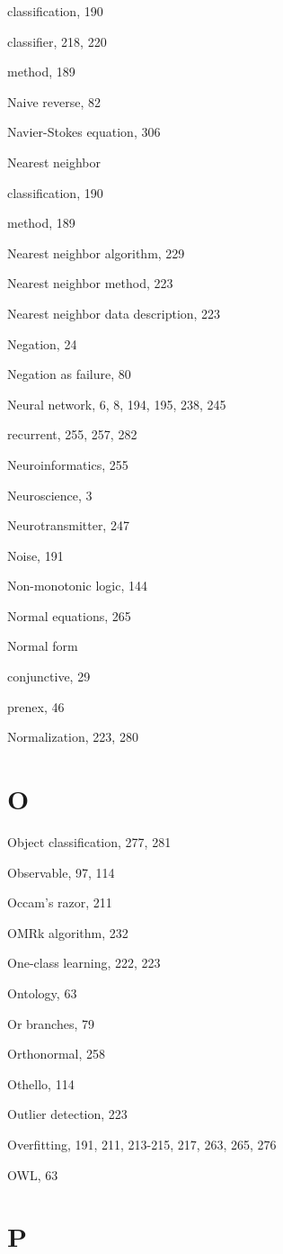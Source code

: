 \documentclass[10pt]{book}
\begin{document}
classification, 190

classifier, 218, 220

method, 189

Naive reverse, 82

Navier-Stokes equation, 306

Nearest neighbor

classification, 190

method, 189

Nearest neighbor algorithm, 229

Nearest neighbor method, 223

Nearest neighbor data description, 223

Negation, 24

Negation as failure, 80

Neural network, 6, 8, 194, 195, 238, 245

recurrent, 255, 257, 282

Neuroinformatics, 255

Neuroscience, 3

Neurotransmitter, 247

Noise, 191

Non-monotonic logic, 144

Normal equations, 265

Normal form

conjunctive, 29

prenex, 46

Normalization, 223, 280

\section{O}

Object classification, 277, 281

Observable, 97, 114

Occam's razor, 211

OMRk algorithm, 232

One-class learning, 222, 223

Ontology, 63

Or branches, 79

Orthonormal, 258

Othello, 114

Outlier detection, 223

Overfitting, 191, 211, 213-215, 217, 263, 265, 276

OWL, 63

\section{P}
\end{document}
